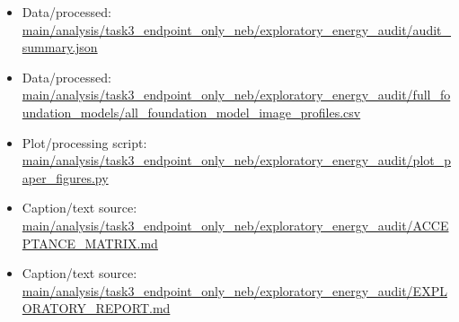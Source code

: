 \begin{itemize}[leftmargin=1.4em,noitemsep]
\item Data/processed: \begingroup\scriptsize\url{main/analysis/task3_endpoint_only_neb/exploratory_energy_audit/audit_summary.json}\endgroup
\item Data/processed: \begingroup\scriptsize\url{main/analysis/task3_endpoint_only_neb/exploratory_energy_audit/full_foundation_models/all_foundation_model_image_profiles.csv}\endgroup
\item Plot/processing script: \begingroup\scriptsize\url{main/analysis/task3_endpoint_only_neb/exploratory_energy_audit/plot_paper_figures.py}\endgroup
\item Caption/text source: \begingroup\scriptsize\url{main/analysis/task3_endpoint_only_neb/exploratory_energy_audit/ACCEPTANCE_MATRIX.md}\endgroup
\item Caption/text source: \begingroup\scriptsize\url{main/analysis/task3_endpoint_only_neb/exploratory_energy_audit/EXPLORATORY_REPORT.md}\endgroup
\end{itemize}
